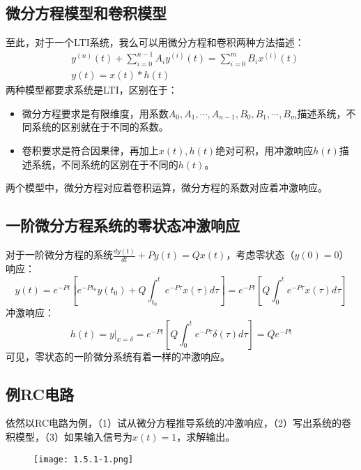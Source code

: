\subsection{微分方程模型和卷积模型}

至此，对于一个LTI系统，我么可以用微分方程和卷积两种方法描述：
\begin{align*}
&y^{\left( n \right)}\left( t \right) +\sum_{i=0}^{n-1}{A_iy^{\left( i \right)}\left( t \right)}=\sum_{i=0}^m{B_ix^{\left( i \right)}\left( t \right)} \\
&y\left( t \right) =x\left( t \right) \ast h\left( t \right)
\end{align*}
两种模型都要求系统是LTI，区别在于：
\begin{itemize}
    \item 微分方程要求是有限维度，用系数$A_0,A_1,\cdots ,A_{n-1},B_0,B_1,\cdots ,B_m$描述系统，不同系统的区别就在于不同的系数。
    \item 卷积要求是符合因果律，再加上$x\left( t \right) ,h\left( t \right) $绝对可积，用冲激响应$h\left( t \right) $描述系统，不同系统的区别在于不同的$h\left( t \right) $。
\end{itemize}
两个模型中，微分方程对应着卷积运算，微分方程的系数对应着冲激响应。

\subsection{一阶微分方程系统的零状态冲激响应}

对于一阶微分方程的系统$\frac{dy\left( t \right)}{dt}+Py\left( t \right) =Qx\left( t \right) $，考虑零状态（$y\left( 0 \right) =0$）响应：
\[
y\left( t \right) =e^{-Pt}\left[ e^{-Pt_0}y\left( t_0 \right) +Q\int_{t_0}^t{e^{-P\tau}x\left( \tau \right) d\tau} \right] =e^{-Pt}\left[ Q\int_0^t{e^{-P\tau}x\left( \tau \right) d\tau} \right]
\]
冲激响应：
\[
h\left( t \right) =\left. y \right|_{x=\delta}=e^{-Pt}\left[ Q\int_0^t{e^{-P\tau}\delta \left( \tau \right) d\tau} \right] =Qe^{-Pt}
\]
可见，零状态的一阶微分系统有着一样的冲激响应。

\subsection{例RC电路}

\begin{example}
依然以RC电路为例，（1）试从微分方程推导系统的冲激响应，（2）写出系统的卷积模型，（3）如果输入信号为$x\left( t \right) =1$，求解输出。
\end{example}
\begin{figure}[h]
\centering
\texttt{[image: 1.5.1-1.png]}
\end{figure}


